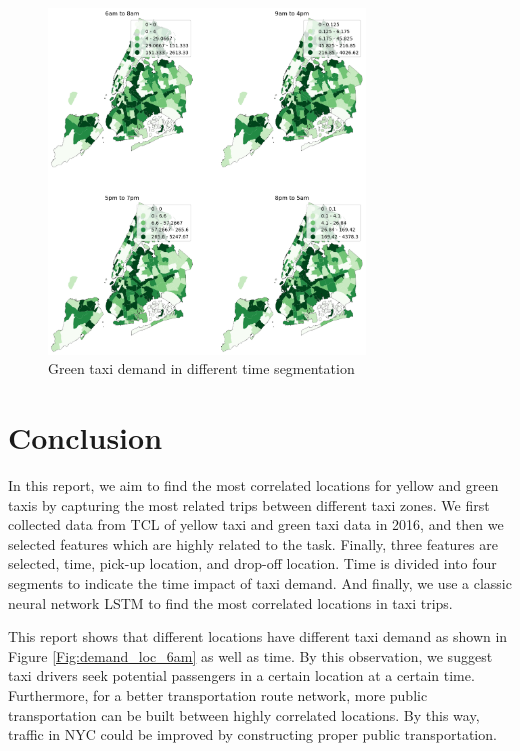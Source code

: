 \documentclass[11pt]{article}
\begin{document}
\begin{figure}[ht]
\includegraphics[width=0.75\textwidth]{plots/green_time_seg.png}
\centering
\caption{Green taxi demand in different time segmentation}
\label{Fig:green_time}
\end{figure}


\section{Conclusion}
In this report, we aim to find the most correlated locations for yellow and green taxis by capturing the most related trips between different taxi zones. We first collected data from TCL of yellow taxi and green taxi data in 2016, and then we selected features which are highly related to the task. Finally, three features are selected, time, pick-up location, and drop-off location. Time is divided into four segments to indicate the time impact of taxi demand. And finally, we use a classic neural network LSTM to find the most correlated locations in taxi trips.

This report shows that different locations have different taxi demand as shown in Figure \ref{Fig:demand_loc_6am} as well as time. By this observation, we suggest taxi drivers seek potential passengers in a certain location at a certain time. Furthermore, for a better transportation route network, more public transportation can be built between highly correlated locations. By this way, traffic in NYC could be improved by constructing proper public transportation.
\end{document}
